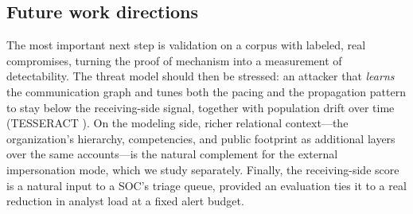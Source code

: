 \subsection{Future work directions}
The most important next step is validation on a corpus with labeled, real compromises, turning the proof of
mechanism into a measurement of detectability. The threat model should then be stressed: an attacker that
\emph{learns} the communication graph and tunes both the pacing and the propagation pattern to stay below the
receiving-side signal, together with population drift over time (TESSERACT \citep{pendlebury2019tesseract}).
On the modeling side, richer relational context---the organization's hierarchy, competencies, and public
footprint as additional layers over the same accounts---is the natural complement for the external
impersonation mode, which we study separately. Finally, the receiving-side score is a natural input to a
SOC's triage queue, provided an evaluation ties it to a real reduction in analyst load at a fixed alert
budget.
